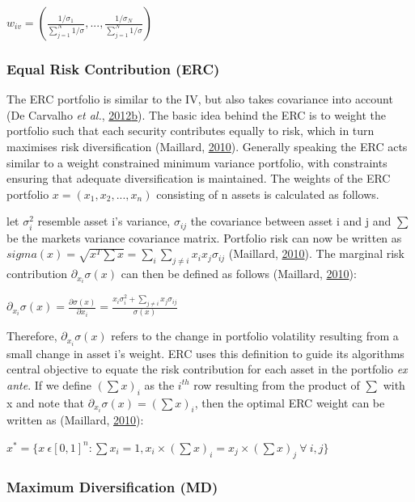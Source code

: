 \documentclass[11pt,preprint, authoryear]{elsarticle}
\numberwithin{equation}{section}
\numberwithin{figure}{section}
\numberwithin{table}{section}
\begin{document}
\(w_{iv}=(\frac{1/\sigma_1}{\sum^N_{j=1} 1/\sigma}, ...,\frac{1/\sigma_N}{\sum^N_{j=1} 1/\sigma} )\)

\hypertarget{equal-risk-contribution-erc}{%
\subsubsection{Equal Risk Contribution
(ERC)}\label{equal-risk-contribution-erc}}

The ERC portfolio is similar to the IV, but also takes covariance into
account (De Carvalho \emph{et al.},
\protect\hyperlink{ref-leote}{2012}\protect\hyperlink{ref-leote}{b}).
The basic idea behind the ERC is to weight the portfolio such that each
security contributes equally to risk, which in turn maximises risk
diversification (Maillard, \protect\hyperlink{ref-maillard2010}{2010}).
Generally speaking the ERC acts similar to a weight constrained minimum
variance portfolio, with constraints ensuring that adequate
diversification is maintained. The weights of the ERC portfolio
\(x=(x_1,x_2,...,x_n)\) consisting of n assets is calculated as follows.

let \(\sigma_i^2\) resemble asset i's variance, \(\sigma_{ij}\) the
covariance between asset i and j and \(\sum\) be the markets variance
covariance matrix. Portfolio risk can now be written as
\(sigma(x)=\sqrt{x^T\sum x}=\sum_i\sum_{j\neq i}x_ix_j\sigma_{ij}\)
(Maillard, \protect\hyperlink{ref-maillard2010}{2010}). The marginal
risk contribution \(\partial_{x_i}\sigma(x)\) can then be defined as
follows (Maillard, \protect\hyperlink{ref-maillard2010}{2010}):

\(\partial_{x_i}\sigma(x)=\frac{\partial\sigma(x)}{\partial x_i}=\frac{x_i\sigma_i^2+\sum_{j\neq i}x_j\sigma_{ij}}{\sigma(x)}\)

Therefore, \(\partial_{x_i}\sigma(x)\) refers to the change in portfolio
volatility resulting from a small change in asset i's weight. ERC uses
this definition to guide its algorithms central objective to equate the
risk contribution for each asset in the portfolio \emph{ex ante}. If we
define \((\sum x)_i\) as the \(i^{th}\) row resulting from the product
of \(\sum\) with x and note that \(\partial_{x_i}\sigma(x)=(\sum x)_i\),
then the optimal ERC weight can be written as (Maillard,
\protect\hyperlink{ref-maillard2010}{2010}):

\(x^*=\{x \ \epsilon[0,1]^n:\sum x_i=1, x_i \times (\sum x)_i=x_j \times (\sum x)_j \ \forall \ i,j \}\)

\hypertarget{maximum-diversification-md}{%
\subsubsection{Maximum Diversification
(MD)}\label{maximum-diversification-md}}
\end{document}
